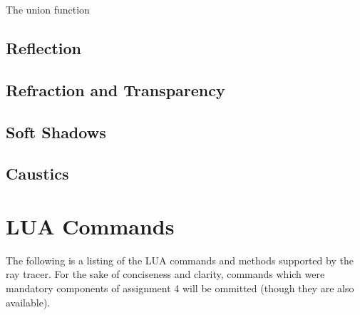 \documentclass{article}
\begin{document}
The union function 

\subsection{Reflection}

\subsection{Refraction and Transparency}

\subsection{Soft Shadows}

\subsection{Caustics}

\section{LUA Commands}

The following is a listing of the LUA commands and methods supported by the ray
tracer. For the sake of conciseness and clarity, commands which were mandatory
components of assignment 4 will be ommitted (though they are also available).

\newcommand{\cmditem}[1]{\item {\tt #1}}
\end{document}
